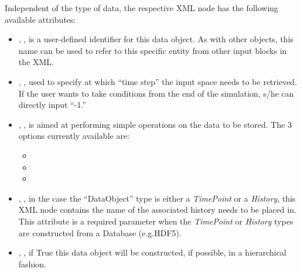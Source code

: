 Independent of the type of data, the respective XML node has the following
available attributes:
\vspace{-5mm}
\begin{itemize}
  \itemsep0em
  \item {}, , is a user-defined
  identifier for this data object.
  \nb As with other objects, this name can be used to refer to this specific
  entity from other input blocks in the XML.
  \item {}, , used to
  specify at which ``time step'' the input space needs to be retrieved.
  \nb If the user wants to take conditions from the end of the simulation, s/he
  can directly input ``-1.''
  \item {}, , is aimed at
  performing simple operations on the data to be stored.
  The 3 options currently available are:
  \begin{itemize}
    \item {}
    \item {}
    \item {}
  \end{itemize}

  \item {}, , in the case  the 
   ``DataObject'' type is either a \textit{TimePoint} or a
  \textit{History}, this XML node contains the name of the associated history needs to be placed in.
  \\\nb This attribute is a required parameter when the  \textit{TimePoint} or \textit{History}
   types are constructed from a Database (e.g.HDF5).

  \item {}, , if True
  this data object will be constructed, if possible, in a hierarchical fashion.
\end{itemize}
